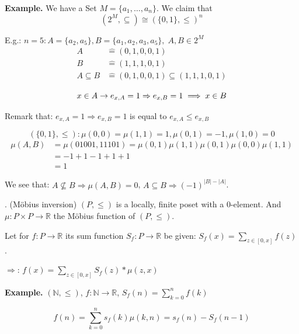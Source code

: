 \textbf{Example.}
We have a Set $M = \{a_1, \ldots , a_n\}$. We claim that
\[
  (2^M, \subseteq) \cong ( \{0,1\}, \leq)^n
\]

E.g.: $n = 5: A = \{a_2,a_5\}, B= \{a_1, a_2, a_3, a_5\},\; A, B \in 2^M$
\begin{align*}
  A &\hat{=} (0,1,0,0,1) \\
  B &\hat{=} (1,1,1,0,1) \\
  A \subseteq B &\hat{=} (0,1,0,0,1) \subseteq (1,1,1,0,1) \\
\end{align*}
\[
  x \in A \rightarrow e_{x,A} = 1 \Rightarrow  e_{x,B} = 1 \implies x \in B\\
\]

Remark that: $e_{x,A} = 1 \Rightarrow e_{x,B} = 1$ is equal to $e_{x,A} \leq e_{x,B}$

\[
    ( \{0,1\}, \leq): \mu(0,0) = \mu(1,1) = 1, \mu(0,1) = -1, \mu(1,0) = 0
\]
\begin{align*}
    \mu(A,B) &= \mu(01001, 11101) = \mu(0,1) \mu(1,1) \mu(0,1) \mu(0,0) \mu(1,1) \\
    &= -1 +1 -1 +1 +1 \\
    &= 1
\end{align*}

We see that:
$A\not\subseteq B \Rightarrow \mu(A,B) = 0$,
$A\subseteq B \Rightarrow (-1)^{|B| - |A|}$.

\Theorem.
(Möbius inversion)
$(P, \leq)$ is a locally, finite poset with a 0-element.
And $\mu: P \times P \rightarrow \mathbb{R}$ the Möbius function of $(P, \leq)$.

Let for $f: P \rightarrow \mathbb{R}$ its sum function $S_f: P \rightarrow \mathbb{R}$ be given: $S_f(x) = \sum_{z \in [0,x]} f(z)$.

$\Rightarrow$: $f(x) = \sum_{z \in [0,x]} S_f(z) * \mu(z,x)$

\textbf{Example.}
$(\mathbb{N}, \leq)$, $f: \mathbb{N} \rightarrow \mathbb{R}$, $S_f(n) = \sum_{k=0}^{n} f(k)$

\[
  f(n) = \sum_{k=0}^{n} s_f(k) \mu(k,n) = s_f(n) - S_f(n-1)
\]

